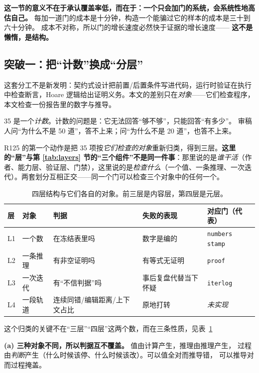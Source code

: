\documentclass[11pt,a4paper]{article}
\newcommand{\code}[1]{\texttt{#1}}
\begin{document}
\textbf{这一节的意义不在于承认覆盖率低，而在于：一个只会加门的系统，会系统性地高估自己。}
每加一道门的成本是十分钟，构造一个能骗过它的样本的成本是三十到六十分钟。
成本不对称，所以门的增长速度必然快于证据的增长速度——
\textbf{这不是懒惰，是结构。}

\subsection{突破一：把“计数”换成“分层”}
这套分工不是新发明：契约式设计\cite{ref19}把前置/后置条件写进代码，运行时验证\cite{ref20}在执行中检查断言，Hoare 逻辑\cite{ref21}给出证明义务。本文的差别只在\emph{对象}——它们检查程序，本文检查一份报告里的数字与推导。


35 是一个\emph{计数}。计数的问题是：它无法回答“够不够”，只能回答“有多少”。
审稿人问“为什么不是 50 道”，答不上来；问“为什么不是 20 道”，也答不上来。

R125 的第一个动作是把 35 项按\emph{它们检查的对象}重新归类，得到三层。\textbf{这里的“层”与第 \ref{tab:layers} 节的“三个组件”不是同一件事}：那里说的是\emph{谁干活}（作者、能力层、验证层、门禁），这里说的是\emph{检查什么}（一个值、一条推理、一次迭代）。两套划分互相正交——同一个门可以检查三个对象中的任何一个。

\begin{table}[tbp]\centering\small
\caption{四层结构与它们各自的对象。前三层是内容层，第四层是元层。}\label{tab:fourlayer}
\setlength{\tabcolsep}{3pt}
\begin{tabular}{p{0.9cm}p{1.9cm}p{2.3cm}p{3.6cm}p{4.1cm}}
\toprule
层 & 对象 & 判据 & 失败的表现 & 对应门（代表）\\
\midrule
L1 & 一个数 & 在冻结表里吗 & 数字是编的 & \code{numbers} \code{stamp}\\
L2 & 一条推理 & 有非空证明吗 & 有等式无证明 & \code{proof}\\
L3 & 一次迭代 & 有“不信判据”吗 & 事后复盘代替当下怀疑 & \code{iterlog}\\
\midrule
L4 & 一段轨道 & 连续同错/编辑距离/上下文占比 & 原地打转 & \emph{未实现}\\
\bottomrule
\end{tabular}
\end{table}

这个归类的关键不在“三层”“四层”这两个数，而在三条性质，见表~\ref{tab:fourlayer}

\textbf{(a) 三种对象不同，所以判据互不覆盖。} 值由计算产生，推理由推理产生，
过程由\emph{判断}产生（什么时候该停、什么时候该改）。可以值全对而推导错，
可以推导对而过程掩盖。
\end{document}
